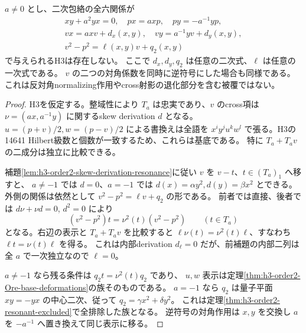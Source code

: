 \begin{theorem}
\label{thm:h3-order2-diagonal-normalizing-chart}
$a\ne0$ とし、二次包絡の全六関係が
\[
\begin{gathered}
 xy+a^2yx=0,\quad px=axp,\quad py=-a^{-1}yp,\\
 vx=axv+d_x(x,y),\quad vy=a^{-1}yv+d_y(x,y),\\
 v^2-p^2=\ell(x,y)v+q_2(x,y)
\end{gathered}
\]
で与えられるH3は存在しない。
ここで $d_x,d_y,q_2$ は任意の二次式、$\ell$ は任意の一次式である。
$v$ の二つの対角係数を同時に逆符号にした場合も同様である。
これは反対角normalizing作用やcross射影の退化部分を含む被覆ではない。
\end{theorem}
\begin{proof}
H3を仮定する。整域性により $T_a$ は忠実であり、$v$ のcross項は
$\nu=(ax,a^{-1}y)$ に関するskew derivation $d$ となる。
$u=(p+v)/2,w=(p-v)/2$ による書換えは全語を
$x^iy^ju^kw^l$ で張る。H3の14641 Hilbert級数と個数が一致するため、これらは基底である。
特に $T_a+T_av$ の二成分は独立に比較できる。

補題\ref{lem:h3-order2-skew-derivation-resonance}に従い $v$ を $v-t$、$t\in(T_a)_1$ へ移すと、
$a\ne-1$ では $d=0$、$a=-1$ では
$d(x)=\alpha y^2,d(y)=\beta x^2$ とできる。
外側の関係は依然として $v^2-p^2=\ell v+q_2$ の形である。
前者では直接、後者では $d\nu+\nu d=0$, $d^2=0$ により
\[
 (v^2-p^2)t=\nu^2(t)(v^2-p^2)\qquad(t\in T_a)
\]
となる。右辺の表示と $T_a+T_av$ を比較すると
$\ell\nu(t)=\nu^2(t)\ell$、すなわち
$\ell t=\nu(t)\ell$ を得る。
これは内部derivation $d_\ell=0$ だが、前補題の内部二列は全 $a$ で一次独立なので $\ell=0$。

$a\ne-1$ なら残る条件は $q_2t=\nu^2(t)q_2$ であり、
$u,w$ 表示は定理\ref{thm:h3-order2-Ore-base-deformations}の族そのものである。
$a=-1$ なら $q_2$ は量子平面 $xy=-yx$ の中心二次、従って
$q_2=\gamma x^2+\delta y^2$。
これは定理\ref{thm:h3-order2-resonant-excluded}で全排除した族となる。
逆符号の対角作用は $x,y$ を交換し $a$ を $-a^{-1}$ へ置き換えて同じ表示に移る。
\end{proof}


